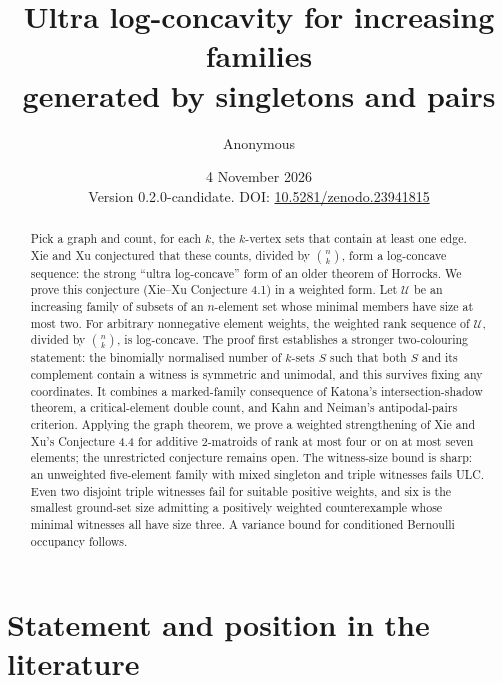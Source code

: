 \documentclass[11pt,a4paper]{article}
\title{Ultra log-concavity for increasing families\protect\\ generated by singletons and pairs}
\author{Anonymous}
\date{4 November 2026\\[2pt] \small Version 0.2.0-candidate. DOI: \href{https://doi.org/10.5281/zenodo.23941815}{10.5281/zenodo.23941815}}
\theoremstyle{remark}
\newcommand{\U}{\mathcal U}
\begin{document}
\maketitle
\begin{abstract}
Pick a graph and count, for each $k$, the $k$-vertex sets that contain at least one edge. Xie and Xu conjectured that these counts, divided by $\binom nk$, form a log-concave sequence: the strong ``ultra log-concave'' form of an older theorem of Horrocks. We prove this conjecture (Xie--Xu Conjecture 4.1) in a weighted form. Let $\U$ be an increasing family of subsets of an $n$-element set whose minimal members have size at most two. For arbitrary nonnegative element weights, the weighted rank sequence of $\U$, divided by $\binom nk$, is log-concave. The proof first establishes a stronger two-colouring statement: the binomially normalised number of $k$-sets $S$ such that both $S$ and its complement contain a witness is symmetric and unimodal, and this survives fixing any coordinates. It combines a marked-family consequence of Katona's intersection-shadow theorem, a critical-element double count, and Kahn and Neiman's antipodal-pairs criterion. Applying the graph theorem, we prove a weighted strengthening of Xie and Xu's Conjecture 4.4 for additive $2$-matroids of rank at most four or on at most seven elements; the unrestricted conjecture remains open. The witness-size bound is sharp: an unweighted five-element family with mixed singleton and triple witnesses fails ULC. Even two disjoint triple witnesses fail for suitable positive weights, and six is the smallest ground-set size admitting a positively weighted counterexample whose minimal witnesses all have size three. A variance bound for conditioned Bernoulli occupancy follows.
\end{abstract}

\section{Statement and position in the literature}
\end{document}
